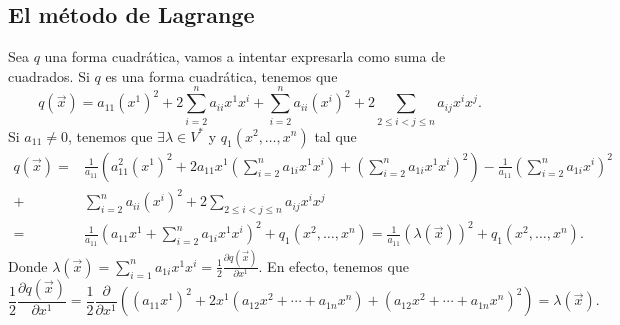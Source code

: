 \subsection*{El método de Lagrange}
Sea $\displaystyle q$ una forma cuadrática, vamos a intentar expresarla como suma de cuadrados. 
Si $\displaystyle q $ es una forma cuadrática, tenemos que 
\[ q\left(\vec{x}\right) = a_{11}\left(x^{1}\right)^{2} + 2 \sum^{n}_{i = 2}a_{ii}x^{1}x^{i} + \sum^{n}_{i=2}a_{ii}\left(x^{i}\right)^{2} + 2 \sum^{}_{2 \leq i < j \leq n}a_{ij}x^{i}x^{j} .\]
Si $\displaystyle a_{11} \neq 0 $, tenemos que $\displaystyle \exists \lambda \in V^{*} $ y $\displaystyle q_{1}\left(x^{2}, \ldots, x^{n}\right) $ tal que 
\[
\begin{split}
	q\left(\vec{x}\right) = 
	 & \frac{1}{a_{11}}\left(a^{2}_{11}\left(x^{1}\right)^{2} + 2a_{11}x^{1}\left(\sum^{n}_{i=2}a_{1i}x^{1}x^{i}\right)+\left(\sum^{n}_{i=2}a_{1i}x^{1}x^{i}\right)^{2}\right) -\frac{1}{a_{11}}\left(\sum^{n}_{i=2}a_{1i}x^{i}\right)^{2}\\
	+ &  \sum^{n}_{i=2}a_{ii}\left(x^{i}\right)^{2}+2\sum^{}_{2\leq i < j \leq n}a_{ij}x^{i}x^{j}\\
	= & \frac{1}{a_{11}}\left(a_{11}x^{1}+\sum^{n}_{i=2}a_{1i}x^{1}x^{i}\right)^{2}+q_{1}\left(x^{2}, \ldots, x^{n}\right) 
	=  \frac{1}{a_{11}}\left(\lambda\left(\vec{x}\right)\right)^{2}+q_{1}\left(x^{2}, \ldots, x^{n}\right).
\end{split}
\]
Donde $\displaystyle \lambda \left(\vec{x}\right) = \sum^{n}_{i=1}a_{1i}x^{1}x^{i} = \frac{1}{2}\frac{\partial q\left(\vec{x}\right)}{\partial x^{1}} $.
En efecto, tenemos que 
\[ \frac{1}{2} \frac{\partial q\left(\vec{x}\right)}{\partial x^{1}} = \frac{1}{2} \frac{ \partial}{\partial x^{1}} \left( \left(a_{11}x^{1}\right)^{2} + 2x^{1}\left(a_{12}x^{2}+ \cdots + a_{1n}x^{n}\right)+\left(a_{12}x^{2} + \cdots + a_{1n}x^{n}\right)^{2}\right) = \lambda\left(\vec{x}\right) .\]
